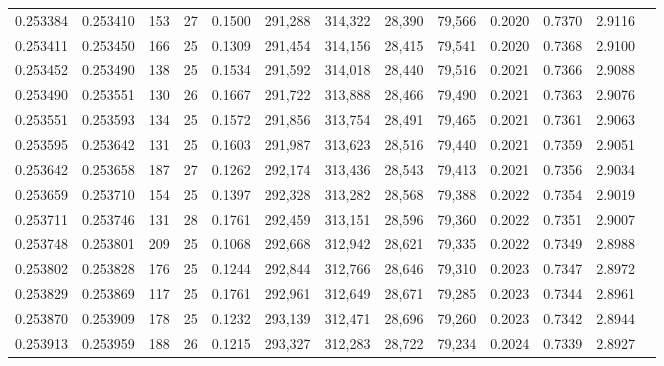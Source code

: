 \begin{tabular}{rrrrrrrrrrrrr}
0.253384 & 0.253410 &   153 &  27 &                                     0.1500 & 291,288 & 314,322 &  28,390 &  79,566 & 0.2020 & 0.7370 & 2.9116 \\
0.253411 & 0.253450 &   166 &  25 &                                     0.1309 & 291,454 & 314,156 &  28,415 &  79,541 & 0.2020 & 0.7368 & 2.9100 \\
0.253452 & 0.253490 &   138 &  25 &                                     0.1534 & 291,592 & 314,018 &  28,440 &  79,516 & 0.2021 & 0.7366 & 2.9088 \\
0.253490 & 0.253551 &   130 &  26 &                                     0.1667 & 291,722 & 313,888 &  28,466 &  79,490 & 0.2021 & 0.7363 & 2.9076 \\
0.253551 & 0.253593 &   134 &  25 &                                     0.1572 & 291,856 & 313,754 &  28,491 &  79,465 & 0.2021 & 0.7361 & 2.9063 \\
0.253595 & 0.253642 &   131 &  25 &                                     0.1603 & 291,987 & 313,623 &  28,516 &  79,440 & 0.2021 & 0.7359 & 2.9051 \\
0.253642 & 0.253658 &   187 &  27 &                                     0.1262 & 292,174 & 313,436 &  28,543 &  79,413 & 0.2021 & 0.7356 & 2.9034 \\
0.253659 & 0.253710 &   154 &  25 &                                     0.1397 & 292,328 & 313,282 &  28,568 &  79,388 & 0.2022 & 0.7354 & 2.9019 \\
0.253711 & 0.253746 &   131 &  28 &                                     0.1761 & 292,459 & 313,151 &  28,596 &  79,360 & 0.2022 & 0.7351 & 2.9007 \\
0.253748 & 0.253801 &   209 &  25 &                                     0.1068 & 292,668 & 312,942 &  28,621 &  79,335 & 0.2022 & 0.7349 & 2.8988 \\
0.253802 & 0.253828 &   176 &  25 &                                     0.1244 & 292,844 & 312,766 &  28,646 &  79,310 & 0.2023 & 0.7347 & 2.8972 \\
0.253829 & 0.253869 &   117 &  25 &                                     0.1761 & 292,961 & 312,649 &  28,671 &  79,285 & 0.2023 & 0.7344 & 2.8961 \\
0.253870 & 0.253909 &   178 &  25 &                                     0.1232 & 293,139 & 312,471 &  28,696 &  79,260 & 0.2023 & 0.7342 & 2.8944 \\
0.253913 & 0.253959 &   188 &  26 &                                     0.1215 & 293,327 & 312,283 &  28,722 &  79,234 & 0.2024 & 0.7339 & 2.8927 \\

\end{tabular}
